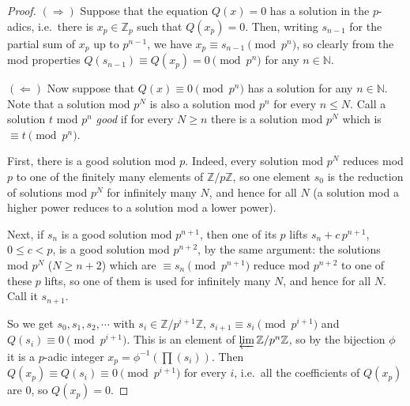 \documentclass[11pt]{article}
\begin{document}
\begin{proof}
$(\Rightarrow)$ Suppose that the equation $Q(x) = 0$ has a solution in the $p$-adics, i.e.\ there is $x_p \in \mathbb{Z}_p$ such that $Q(x_p) = 0$. Then, writing $s_{n-1}$ for the partial sum of $x_p$ up to $p^{n-1}$, we have $x_p \equiv s_{n-1} \pmod{p^n}$, so clearly from the mod properties $Q(s_{n-1}) \equiv Q(x_p) = 0 \pmod{p^n}$ for any $n \in \mathbb{N}$.

$(\Leftarrow)$ Now suppose that $Q(x) \equiv 0 \pmod{p^n}$ has a solution for any $n \in \mathbb{N}$. Note that a solution mod $p^{N}$ is also a solution mod $p^n$ for every $n \leq N$. Call a solution $t$ mod $p^n$ \emph{good} if for every $N \geq n$ there is a solution mod $p^N$ which is $\equiv t \pmod{p^n}$.

First, there is a good solution mod $p$. Indeed, every solution mod $p^N$ reduces mod $p$ to one of the finitely many elements of $\mathbb{Z}/p\mathbb{Z}$, so one element $s_0$ is the reduction of solutions mod $p^N$ for infinitely many $N$, and hence for all $N$ (a solution mod a higher power reduces to a solution mod a lower power).

Next, if $s_n$ is a good solution mod $p^{n+1}$, then one of its $p$ lifts $s_n + c\,p^{n+1}$, $0 \leq c < p$, is a good solution mod $p^{n+2}$, by the same argument: the solutions mod $p^N$ ($N \geq n+2$) which are $\equiv s_n \pmod{p^{n+1}}$ reduce mod $p^{n+2}$ to one of these $p$ lifts, so one of them is used for infinitely many $N$, and hence for all $N$. Call it $s_{n+1}$.

So we get $s_0, s_1, s_2, \cdots$ with $s_i \in \mathbb{Z}/p^{i+1}\mathbb{Z}$, $s_{i+1} \equiv s_i \pmod{p^{i+1}}$ and $Q(s_i) \equiv 0 \pmod{p^{i+1}}$. This is an element of $\varprojlim \mathbb{Z}/p^n\mathbb{Z}$, so by the bijection $\phi$ it is a $p$-adic integer $x_p = \phi^{-1}\left(\prod (s_i)\right)$. Then $Q(x_p) \equiv Q(s_i) \equiv 0 \pmod{p^{i+1}}$ for every $i$, i.e.\ all the coefficients of $Q(x_p)$ are $0$, so $Q(x_p) = 0$.
\end{proof}
\end{document}
